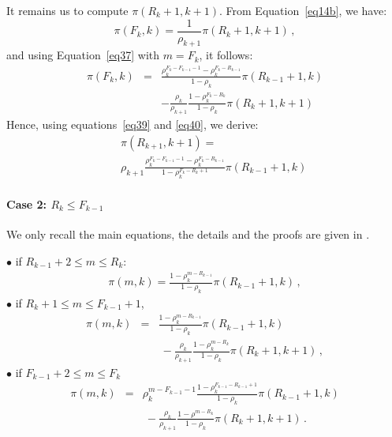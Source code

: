 \documentclass[conference]{IEEEtran}
\begin{document}
It remains us to compute $\pi(R_{k}+1, k+1)$. From Equation~\eqref{eq14b}, we have:
\begin{equation}
\pi(F_{k},k)= \frac{1}{\rho_{k+1}} \pi(R_{k}+1,k+1) \, ,
\label{eq39}
\end{equation} 
and using Equation~\eqref{eq37} with $m=F_k$, it follows:
\begin{eqnarray}
\pi(F_k,k)&=& \frac{ \rho_k ^{F_k-F_{k-1}-1} -\rho_k^{F_k-R_{k-1}} } {1-\rho_k} \pi(R_{k-1}+1,k) \nonumber \\
&&- \frac{\rho_k}{\rho_{k+1}} \frac{1- \rho_k ^{F_k-R_k}} {1-\rho_k} \pi(R_{k}+1, k+1)
 \label{eq40}
\end{eqnarray} 
Hence, using equations~\eqref{eq39} and \eqref{eq40}, we derive:
\begin{eqnarray}
&&\pi(R_{k+1},k+1)= \nonumber\\
&&\rho_{k+1} \frac{ \rho_k^{F_k-F_{k-1}-1}
-\rho_k^{F_k-R_{k-1}} } { 1- \rho_k^{F_k-R_{k}+1}} \pi(R_{k-1}+1,k)
\label{eq50}
\end{eqnarray}

\paragraph{Case 2: $R_{k} \leq F_{k-1}$}
We only recall the main equations, the details and the proofs are given in \cite{le2000simple}.

\noindent
$\bullet$ if  $R_{k-1}+2 \leq m \leq R_k$:
\begin{eqnarray}
\pi(m,k)=\frac{1-\rho_k^{m-R_{k-1}}}{1-\rho_k} \pi(R_{k-1}+1,k) \, ,
\label{eqB1}
\end{eqnarray}
$\bullet$ if $R_k+1 \leq m \leq F_{k-1}+1$,
\begin{eqnarray}
 \pi(m,k)&=&\frac{1-\rho_k^{m-R_{k-1} }} {1-\rho_k} \pi(R_{k-1}+1,k) \nonumber\\
&& \ -\frac{\rho_k}{\rho_{k+1}} \frac{1- \rho_k^{m-R_k}}{1-\rho_k} \pi(R_k+1,k+1) \, ,
\label{eqB2}
 \end{eqnarray}
$\bullet$ if $F_{k-1}+2 \leq m \leq F_k$
 \begin{eqnarray}
 \pi(m,k)&= & \rho_k^{m-F_{k-1}-1} \frac{1-\rho_k^{F_{k-1}-R_{k-1}+1}} {1-\rho_k} \pi(R_{k-1}+1,k) \nonumber \\
 && \ - \frac{\rho_k}{\rho_{k+1}}
\frac{1-\rho^{m-R_k}}{1-\rho_k} \pi(R_{k}+1,k+1) \, .
\label{eqB3}
 \end{eqnarray}
\end{document}
